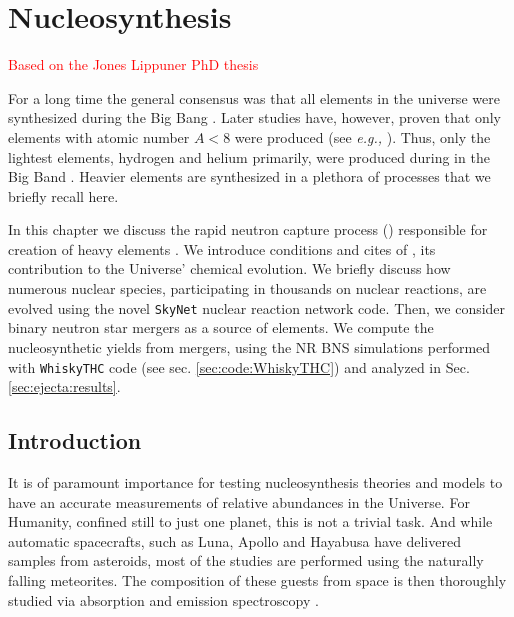 
\chapter{Nucleosynthesis} %

\label{ChapterX} %

\textcolor{red}{Based on the Jones Lippuner PhD thesis}

For a long time the general consensus was that all elements in the universe were synthesized during the Big Bang \citep{Alpher:1948}. Later studies have, however, proven that only elements with atomic number $A<8$ were produced (see \textit{e.g.,} \citet{Alpher:1950,Shaviv:2012}). Thus, only the lightest elements, hydrogen and helium primarily, were produced during in the Big Band \citep{Burbidge:1957}. Heavier elements are synthesized in a plethora of processes that we briefly recall here.

In this chapter we discuss the rapid neutron capture process (\rproc{}) responsible for creation of heavy elements \cite{Burbidge:1957}. We introduce conditions and cites of \rproc{}, its contribution to the Universe' chemical evolution. We briefly discuss how numerous nuclear species, participating in thousands on nuclear reactions, are evolved using the novel \texttt{SkyNet} nuclear reaction network code. Then, we consider binary neutron star mergers as a source of \rproc{} elements. We compute the nucleosynthetic yields from mergers, using the \ac{NR} \ac{BNS} simulations performed with \texttt{WhiskyTHC} code (see sec. \ref{sec:code:WhiskyTHC}) and analyzed in Sec.\ref{sec:ejecta:results}.



\section{Introduction}

It is of paramount importance for testing nucleosynthesis theories and models to have an accurate measurements of relative abundances in the Universe. For Humanity, confined still to just one planet, this is not a trivial task. And while automatic spacecrafts, such as Luna, Apollo and Hayabusa have delivered samples from asteroids, most of the studies are performed using the naturally falling meteorites. The composition of these guests from space is then thoroughly studied via absorption and emission spectroscopy \citep{Shaviv:2012}.

